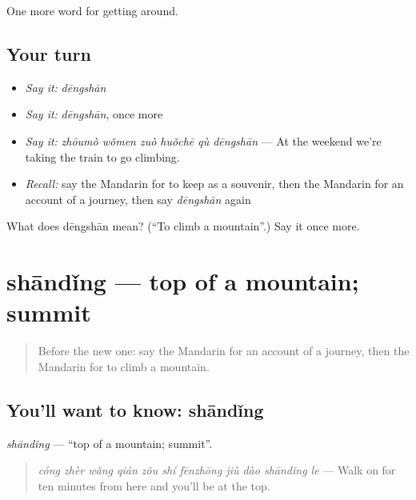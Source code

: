 \begin{grammarlens}[title={What you've built}]
One more word for getting around.
\end{grammarlens}

\subsection*{Your turn}
\begin{itemize}
\raggedright
  \item \emph{Say it:} \emph{dēngshān}
  \item \emph{Say it:} \emph{dēngshān}, once more
  \item \emph{Say it:} \emph{zhōumò wǒmen zuò huǒchē qù dēngshān} — At the weekend we're taking the train to go climbing.
  \item \emph{Recall:} say the Mandarin for to keep as a souvenir, then the Mandarin for an account of a journey, then say \emph{dēngshān} again
\end{itemize}

\begin{tcolorbox}[breakable,colback=teal!4,colframe=teal!35!black,title={Before you move on}]
What does dēngshān mean? (\textquotedblleft{}To climb a mountain\textquotedblright{}.) Say it once more.
\end{tcolorbox}
\section[shāndǐng]{shāndǐng — top of a mountain; summit}

\label{lesson:ZH-C435-shanding}



\begin{quote}
Before the new one: say the Mandarin for an account of a journey, then the Mandarin for to climb a mountain.
\end{quote}

\subsection*{You'll want to know: shāndǐng}
\emph{shāndǐng} — \textquotedblleft{}top of a mountain; summit\textquotedblright{}.

\begin{quote}
\emph{cóng zhèr wǎng qián zǒu shí fēnzhōng jiù dào shāndǐng le} — Walk on for ten minutes from here and you'll be at the top.
\end{quote}

